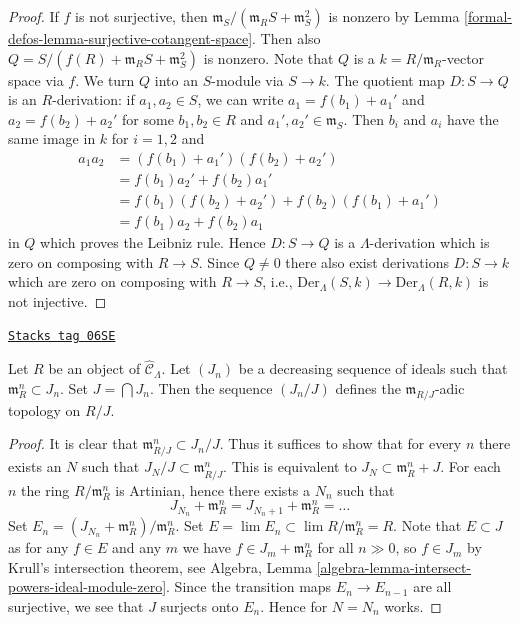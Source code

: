 \begin{proof}
If $f$ is not surjective, then
$\mathfrak m_S/(\mathfrak m_R S + \mathfrak m_S^2)$ is nonzero by
Lemma \ref{formal-defos-lemma-surjective-cotangent-space}.
Then also $Q = S/(f(R) + \mathfrak m_R S + \mathfrak m_S^2)$ is nonzero.
Note that $Q$ is a $k = R/\mathfrak m_R$-vector space via $f$. We turn
$Q$ into an $S$-module via $S \to k$. The quotient
map $D : S \to Q$ is an $R$-derivation: if $a_1, a_2 \in S$, we can write
$a_1 = f(b_1) + a_1'$ and $a_2 = f(b_2) + a_2'$ for some
$b_1, b_2 \in R$ and $a_1', a_2' \in \mathfrak m_S$. Then
$b_i$ and $a_i$ have the same image in $k$ for $i = 1, 2$ and
\begin{align*}
a_1a_2 & = (f(b_1) + a_1')(f(b_2) + a_2') \\
& = f(b_1)a_2' + f(b_2)a_1' \\
& = f(b_1)(f(b_2) + a_2') + f(b_2)(f(b_1) + a_1') \\
& = f(b_1)a_2 + f(b_2)a_1
\end{align*}
in $Q$ which proves the Leibniz rule. Hence $D : S \to Q$ is a
$\Lambda$-derivation which is zero on composing with $R \to S$.
Since $Q \not = 0$ there also exist derivations $D : S \to k$ which
are zero on composing with $R \to S$, i.e.,
$\text{Der}_\Lambda(S, k) \to \text{Der}_\Lambda(R, k)$ is not injective.
\end{proof}

\begin{lemma}
\label{formal-defos-lemma-m-adic-topology}
\href{https://stacks.math.columbia.edu/tag/06SE}{\texttt{Stacks tag 06SE}}

Let $R$ be an object of $\widehat{\mathcal{C}}_\Lambda$. Let $(J_n)$ be a
decreasing sequence of ideals such that $\mathfrak m_R^n \subset J_n$.
Set $J = \bigcap J_n$. Then the sequence $(J_n/J)$ defines the
$\mathfrak m_{R/J}$-adic topology on $R/J$.
\end{lemma}

\begin{proof}
It is clear that $\mathfrak m_{R/J}^n \subset J_n/J$. Thus it suffices
to show that for every $n$ there exists an $N$ such that
$J_N/J \subset \mathfrak m_{R/J}^n$. This is equivalent to
$J_N \subset \mathfrak m_R^n + J$. For each $n$ the ring $R/\mathfrak m_R^n$
is Artinian, hence there exists a $N_n$ such that
$$
J_{N_n} + \mathfrak m_R^n = J_{N_n + 1} + \mathfrak m_R^n = \ldots
$$
Set $E_n = (J_{N_n} + \mathfrak m_R^n)/\mathfrak m_R^n$.
Set $E = \lim E_n \subset \lim R/\mathfrak m_R^n = R$.
Note that $E \subset J$ as for any $f \in E$ and any $m$
we have $f \in J_m + \mathfrak m_R^n$ for all $n \gg 0$, so
$f \in J_m$ by Krull's intersection theorem, see
Algebra, Lemma \ref{algebra-lemma-intersect-powers-ideal-module-zero}.
Since the transition maps $E_n \to E_{n - 1}$ are all surjective,
we see that $J$ surjects onto $E_n$. Hence for $N = N_n$ works.
\end{proof}

